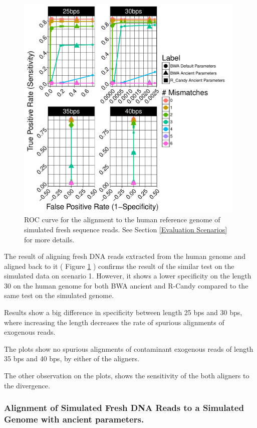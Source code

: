 \documentclass[11pt,a4paper]{report}
\begin{document}
\begin{figure}[H]
\centering
\includegraphics[width=11cm]{pictures/f_DS6_emp.pdf}
\caption{ 
ROC curve for the alignment to the human reference genome of simulated 
fresh sequence reads. See Section \ref{Evaluation Scenarios} 
for more details.
}
\label{DS6_emp}
\end{figure}
 


The result of aligning fresh DNA reads extracted from the human genome and 
aligned back to it ( Figure \ref{DS6_emp} ) confirms the result of the similar 
test on the simulated data on scenario 1.  However, it shows a lower specificity 
on the length 30 on the human genome for both BWA ancient and R-Candy compared
to the same test on the simulated genome.

Results show a big difference in specificity between length 25 bps and 30 bps, 
where increasing the length decreases the rate of spurious alignments of exogenous
reads.

The plots show no spurious alignments of contaminant exogenous reads of length 
35 bps and 40 bps, by either of the aligners.

The other observation on the plots, shows the sensitivity of the both aligners
to the divergence.




 \subsubsection {Alignment of Simulated Fresh DNA Reads to a Simulated Genome 
 with ancient parameters.}
\end{document}

